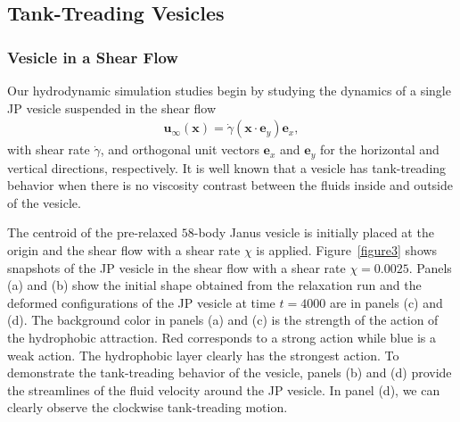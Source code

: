 \documentclass[lineno]{jfm}
\newcommand{\xx}{\mathbf{x}}
\newcommand{\uu}{\mathbf{u}}
\begin{document}



\subsection{Tank-Treading Vesicles}

\subsubsection{Vesicle in a Shear Flow}
\label{sec:ves_in_shear}
Our hydrodynamic simulation studies begin by studying the dynamics of a single JP vesicle suspended in
the shear flow
\begin{align}
  \uu_{\infty}(\xx) = \dot\gamma (\xx \cdot \mathbf{e}_y) \mathbf{e}_x,
\end{align}
with shear rate $\dot\gamma$, and orthogonal unit vectors $\mathbf{e}_x$
and $\mathbf{e}_y$ for the horizontal and vertical directions,
respectively. It is well known that a vesicle has tank-treading behavior
when there is no viscosity contrast between the fluids inside and
outside of the vesicle.

The centroid of the pre-relaxed $58$-body Janus vesicle is initially
placed at the origin and the shear flow with a shear rate $\chi$ is
applied. Figure~\ref{figure3} shows snapshots of the JP vesicle in the
shear flow with a shear rate $\chi=0.0025$. Panels (a) and (b) show the
initial shape obtained from the relaxation run and the deformed
configurations of the JP vesicle at time $t=4000$ are in panels (c) and
(d). The background color in panels (a) and (c) is the strength of the
action of the hydrophobic attraction. Red corresponds to a strong action
while blue is a weak action. The hydrophobic layer clearly has the
strongest action. To demonstrate the tank-treading behavior of the
vesicle, panels (b) and (d) provide the streamlines of the fluid
velocity around the JP vesicle. In panel (d), we can clearly observe the
clockwise tank-treading motion.
\end{document}
